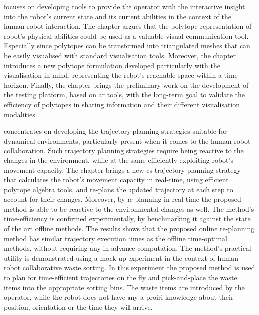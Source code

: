  focuses on developing tools to provide the operator with the interactive insight into the robot's current state and its current abilities in the context of the human-robot interaction.
The chapter argues that the polytope representation of robot's physical abilities could be used as a valuable visual communication tool. Especially since polytopes can be transformed into triangulated meshes that can be easily visualised with standard visualisation tools. Moreover, the chapter introduces a new polytope formulation developed particularly with the visualisation in mind, representing the robot's reachable space within a time horizon. Finally, the chapter brings the preliminary work on the development of the testing platform, based on \gls{ar} tools, with the long-term goal to validate the efficiency of polytopes in sharing information and their different visualisation modalities.

 concentrates on developing the trajectory planning strategies suitable for dynamical environments, particularly present when it comes to the human-robot collaboration. Such trajectory planning strategies require being reactive to the changes in the environment, while at the same efficiently exploiting robot's movement capacity. 
The chapter brings a new \gls{cs} trajectory planning strategy that calculates the robot's movement capacity in real-time, using efficient polytope algebra tools, and re-plans the updated trajectory at each step to account for their changes. Moreover, by re-planning in real-time the proposed method is able to be reactive to the environmental changes as well. The method's time-efficiency is confirmed experimentally, by benchmarking it against the state of the art offline methods. The results shows that the proposed online re-planning method has similar trajectory execution times as the offline time-optimal methods, without requiring any in-advance computation. The method's practical utility is demonstrated using a mock-up experiment in the context of human-robot collaborative waste sorting. In this experiment the proposed method is used to plan for time-efficient trajectories on the fly and pick-and-place the waste items into the appropriate sorting bins. The waste items are introduced by the operator, while the robot does not have any a proiri knowledge about their position, orientation or the time they will arrive. 


